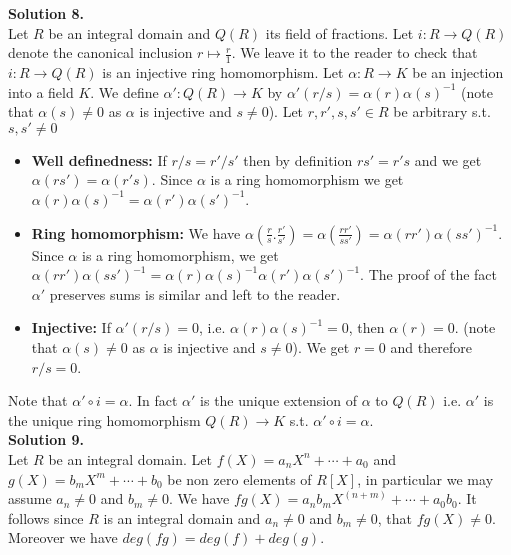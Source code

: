 \documentclass[12pt,a4paper]{article}
\begin{document}
\textbf{Solution 8. }\\

Let $R$ be an integral domain and $Q(R)$ its field of fractions. Let $i:R\xrightarrow{}Q(R)$ denote the canonical inclusion $r\mapsto \frac{r}{1}$. We leave it to the reader to check that $i:R\xrightarrow{}Q(R)$ is an injective ring homomorphism. Let $\alpha:R\xrightarrow{}K$ be an injection into a field $K$. We define $\alpha':Q(R)\xrightarrow{}K$ by $\alpha'(r/s)=\alpha(r)\alpha(s)^{-1}$ (note that $\alpha(s)\neq 0$ as $\alpha$ is injective and $s\neq 0$). Let $r,r',s,s'\in R$ be arbitrary s.t. $s,s'\neq 0$ 

\begin{itemize}
    \item \textbf{Well definedness:} If $r/s=r'/s'$ then by definition $rs'=r's$ and we get $\alpha(rs')=\alpha(r's)$. Since $\alpha$ is a ring homomorphism we get $\alpha(r)\alpha(s)^{-1}=\alpha(r')\alpha(s')^{-1}$. 
    \item \textbf{Ring homomorphism:} We have $\alpha(\frac{r}{s}.\frac{r'}{s'})=\alpha(\frac{rr'}{ss'})=\alpha(rr')\alpha(ss')^{-1}$. Since $\alpha$ is a ring homomorphism, we get  $\alpha(rr')\alpha(ss')^{-1}=\alpha(r)\alpha(s)^{-1}\alpha(r')\alpha(s')^{-1}$. The proof of the fact $\alpha'$ preserves sums is similar and left to the reader.
    \item \textbf{Injective:} If $\alpha'(r/s)=0$, i.e. $\alpha(r)\alpha(s)^{-1}=0$, then $\alpha(r)=0$. (note that $\alpha(s)\neq 0$ as $\alpha$ is injective and $s\neq 0$). We get $r=0$ and therefore $r/s=0$. 
\end{itemize}{}

Note that $\alpha'\circ i=\alpha$. In fact $\alpha'$ is the unique extension of $\alpha$ to $Q(R)$ i.e. $\alpha'$ is the unique ring homomorphism $Q(R)\xrightarrow{}K$ s.t. $\alpha'\circ i=\alpha$. \\

\textbf{Solution 9. }\\

Let $R$ be an integral domain. Let $f(X)=a_nX^n+\cdots+a_0$ and $g(X)=b_mX^m+\cdots+b_0$ be non zero elements of $R[X]$, in particular we may assume $a_n\neq 0$ and $b_m\neq 0$. We have $fg(X)=a_nb_mX^{(n+m)}+\cdots+a_0b_0$. It follows since $R$ is an integral domain and $a_n\neq 0$ and $b_m\neq 0$, that $fg(X)\neq 0$. Moreover we have $deg(fg)=deg(f)+deg(g)$. 
\end{document}
